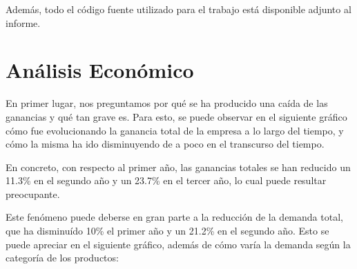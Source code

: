 \documentclass[12pt,a4paper]{article}
\begin{document}
\vspace{0.2cm}

Además, todo el código fuente utilizado para el trabajo está disponible adjunto al informe.



\newpage

\section{Análisis Económico}

En primer lugar, nos preguntamos por qué se ha producido una caída de las ganancias y qué tan grave es. Para esto, se puede observar 
en el siguiente gráfico cómo fue evolucionando la ganancia total de la empresa a lo largo del tiempo, y cómo la misma ha ido disminuyendo de a poco 
en el transcurso del tiempo.
\begin{center}
\end{center}

En concreto, con respecto al primer año, las ganancias totales se han reducido un 11.3\% en el segundo año y un 23.7\% en el tercer año, 
lo cual puede resultar preocupante.

\vspace{0.2cm}

Este fenómeno puede deberse en gran parte a la reducción de la demanda total, que ha disminuído 10\% el primer año y un 21.2\% en el segundo año. 
Esto se puede apreciar en el siguiente gráfico, además de cómo varía la demanda según la categoría de los productos:
\begin{center}
\end{center}
\end{document}
